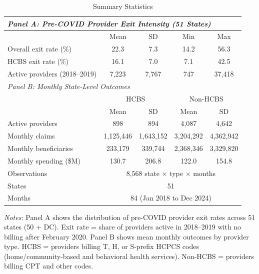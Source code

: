 \begin{table}[t]
\centering
\caption{Summary Statistics}
\label{tab:summary}
\begin{tabular}{lcccc}
\toprule
\multicolumn{5}{l}{\textit{Panel A: Pre-COVID Provider Exit Intensity (51 States)}} \\
\midrule
 & Mean & SD & Min & Max \\
Overall exit rate (\%) & 22.3 & 7.3 & 14.2 & 56.3 \\
HCBS exit rate (\%) & 16.1 & 7.0 & 7.1 & 42.5 \\
Active providers (2018--2019) & 7,223 & 7,767 & 747 & 37,418 \\
\midrule
\multicolumn{5}{l}{\textit{Panel B: Monthly State-Level Outcomes}} \\
\midrule
 & \multicolumn{2}{c}{HCBS} & \multicolumn{2}{c}{Non-HCBS} \\
 & Mean & SD & Mean & SD \\
Active providers & 898 & 894 & 4,087 & 4,642 \\
Monthly claims & 1,125,446 & 1,643,152 & 3,204,292 & 4,362,942 \\
Monthly beneficiaries & 233,179 & 339,744 & 2,368,346 & 3,329,820 \\
Monthly spending (\$M) & 130.7 & 206.8 & 122.0 & 154.8 \\
\midrule
Observations & \multicolumn{4}{c}{8,568 state $\times$ type $\times$ months} \\
States & \multicolumn{4}{c}{51} \\
Months & \multicolumn{4}{c}{84 (Jan 2018 to Dec 2024)} \\
\bottomrule
\end{tabular}
\begin{minipage}{0.95\textwidth}
\vspace{0.2cm}
\footnotesize \textit{Notes:} Panel A shows the distribution of pre-COVID provider exit rates across 51 states (50 + DC). Exit rate = share of providers active in 2018--2019 with no billing after February 2020. Panel B shows mean monthly outcomes by provider type. HCBS = providers billing T, H, or S-prefix HCPCS codes (home/community-based and behavioral health services). Non-HCBS = providers billing CPT and other codes.
\end{minipage}
\end{table}
